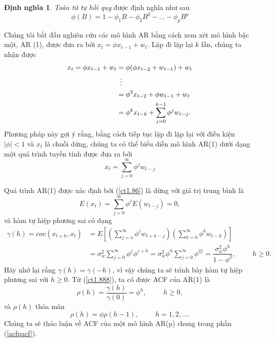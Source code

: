\documentclass[12pt, a4paper,oneside]{book}
\theoremstyle{definition}
\newtheorem{dn}[theo]{Định nghĩa}
\begin{document}
\begin{dn} \textit{Toán tử tự hồi quy} được định nghĩa như sau
\begin{equation}
\phi(B) = 1-\phi_{1}B - \phi_{2}B^{2}- ... - \phi_{p}B^{p} \label{ct1.85}
\end{equation}	

Chúng tôi bắt đầu nghiên cứu các mô hình AR bằng cách xem xét mô hình bậc một, AR (1), được đưa ra bởi $x_{t} = \phi x_{t-1} + w_{t}$. Lặp đi lặp lại $k$ lần, chúng ta nhận được
	\begin{align*}
	x_{t}=\phi x_{t-1} +w_{t} &= \phi(\phi x_{t-2} +w_{t-1}) +w_{t}\\& \enskip\vdots\\&= \phi^{2}x_{t-2} + \phi w_{t-1} +w_{t}\\&= \phi^{k}x_{t-k} + \sum_{j=0}^{k-1}\phi^{j}w_{t-j}.
	\end{align*}
Phương pháp này gợi ý rằng, bằng cách tiếp tục lặp đi lặp lại với điều kiện $| \phi | <1$ và $x_{t}$ là chuỗi dừng, chúng ta có thể biểu diễn mô hình AR(1) dưới dạng một quá trình tuyến tính được đưa ra bởi
	\begin{equation}
	x_{t}= \sum_{j=0}^{\infty} \phi^{j}w_{t-j} \label{ct1.86}	
	\end{equation}
	
Quá trình AR(1) được xác định bởi (\ref{ct1.86}) là dừng với giá trị trung bình là
	\begin{equation}
	E(x_{t})= \sum_{j=0}^{\infty}\phi^{j} E(w_{t-j})=0, \label{ct1.87}	
	\end{equation}
và hàm tự hiệp phương sai có dạng
    \begin{align}
	\gamma(h)= cov(x_{t+h}, x_{t}) &=E[(\sum_{j=o}^{\infty}\phi^{j}w_{t+h-j})(\sum_{k=0}^{\infty}\phi^{k}w_{t-k})]\\&= \sigma_{w}^{2} \sum_{j=0}^{\infty} \phi^{j}\phi^{j+h} = \sigma_{w}^{2}\phi^{h} \sum_{j=0}^{\infty}\phi^{2j} =  \dfrac{\sigma_{w}^{2}\phi^{h}}{1- \phi^{2}}, \hspace{1cm} h\geq 0.
     \label{ct1.888}
     \end{align}
Hãy nhớ lại rằng $\gamma(h) = \gamma (-h)$, vì vậy chúng ta sẽ trình bày hàm tự hiệp phương sai với $h \geq 0$. Từ (\ref{ct1.888}), ta có được ACF của AR(1) là
	\begin{equation}
	\rho(h)= \dfrac{\gamma(h)}{\gamma(0)}= \phi^h, \hspace{1cm} h\geq 0, \label{ct1.88}
	\end{equation}
	và $\rho(h)$ thỏa mãn
	\begin{equation}
	\rho(h)= \phi \rho(h-1),\hspace{1cm} h=1,2,\dots. \label{ct1.89}
	\end{equation}
Chúng ta sẽ thảo luận về ACF của một mô hình AR(p) chung trong phần (\ref{acfpacf}).
	

\end{dn}
\end{document}
